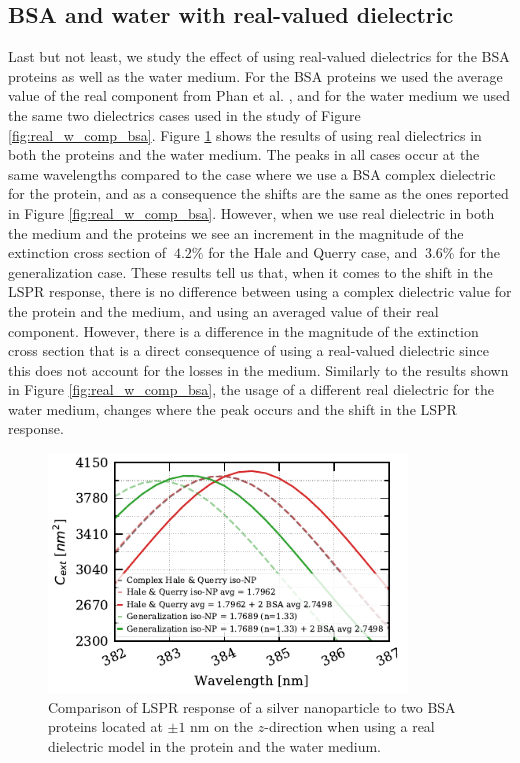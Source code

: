  \subsection{BSA and water with real-valued dielectric}

Last but not least, we study the effect of using real-valued dielectrics for the BSA proteins as well as the water medium. For the BSA proteins 
we used the average value of the real component from Phan et al. \cite{PhanETal2013}, and for the water medium we used the same two dielectrics cases
used in the study of Figure \ref{fig:real_w_comp_bsa}. Figure \ref{fig:bsa_w_real} shows the results of using real dielectrics in both the proteins and
the water medium. The peaks in all cases occur at the same wavelengths compared to the case where we use a BSA complex dielectric for the protein, and as a 
consequence the shifts are the same as the ones reported in Figure \ref{fig:real_w_comp_bsa}. However, when we use real dielectric in both the medium 
and the proteins we see an increment in the magnitude of the extinction cross section of $~4.2\%$ for the Hale and Querry case, and $~3.6\%$ for the 
generalization case. These results tell us that, when it comes to the shift in the LSPR response, there is no difference between using a complex dielectric 
value for the protein and the medium, and using an averaged value of their real component. However, there is a difference in the magnitude of the 
extinction cross section that is a direct consequence of using a real-valued dielectric since this does not account for the losses in the medium. Similarly to the 
results shown in Figure \ref{fig:real_w_comp_bsa}, the usage of a different real dielectric for the water medium, changes where the peak occurs and the shift in the 
LSPR response. 

 \begin{figure} %
    \centering
    \includegraphics[width=0.85\textwidth]{bsa_phan_avg_real_water_diel.pdf} 
    \caption{Comparison of LSPR response of a silver nanoparticle to two BSA proteins located at $\pm1$ nm on the $z$-direction
    when using a real dielectric model in the protein and the water medium.}
    \label{fig:bsa_w_real}
 \end{figure}

